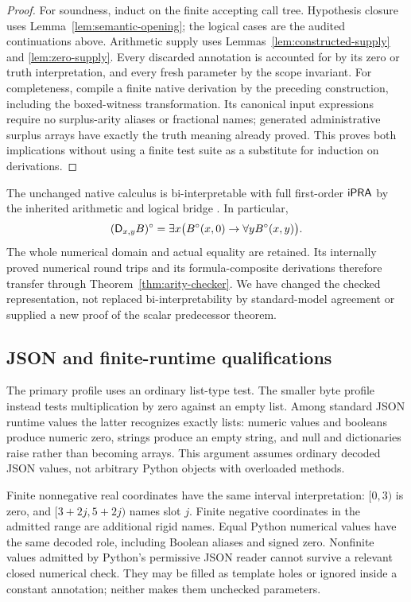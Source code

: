\begin{proof}
For soundness, induct on the finite accepting call tree.  Hypothesis
closure uses Lemma~\ref{lem:semantic-opening}; the logical cases are
the audited continuations above.  Arithmetic supply uses
Lemmas~\ref{lem:constructed-supply} and \ref{lem:zero-supply}.
Every discarded annotation is accounted for by its zero or truth
interpretation, and every fresh parameter by the scope invariant.
For completeness, compile a finite native derivation by the preceding
construction, including the boxed-witness transformation.  Its
canonical input expressions require no surplus-arity aliases or fractional
names; generated administrative surplus arrays have exactly the truth
meaning already proved.  This proves both implications without using a finite test
suite as a substitute for induction on derivations.
\end{proof}

The unchanged native calculus is bi-interpretable with full first-order
$\mathsf{iPRA}$ by the inherited arithmetic and logical bridge
\cite{generated,corpus}.  In particular,
\[
 (\mathsf D_{x,y}B)^\circ
 =\exists x\bigl(B^\circ(x,0)\to\forall yB^\circ(x,y)\bigr).
\]
The whole numerical domain and actual equality are retained.  Its
internally proved numerical round trips and its formula-composite
derivations therefore transfer through
Theorem~\ref{thm:arity-checker}.  We have changed the checked
representation, not replaced bi-interpretability by standard-model
agreement or supplied a new proof of the scalar predecessor theorem.

\subsection{JSON and finite-runtime qualifications}

The primary profile uses an ordinary list-type test.  The smaller byte
profile instead tests multiplication by zero against an empty list.
Among standard JSON runtime values the latter recognizes exactly lists:
numeric values and booleans produce numeric zero, strings produce an
empty string, and null and dictionaries raise rather than becoming
arrays.  This argument assumes ordinary decoded JSON values, not
arbitrary Python objects with overloaded methods.

Finite nonnegative real coordinates have the same interval
interpretation: $[0,3)$ is zero, and $[3+2j,5+2j)$ names slot $j$.
Finite negative coordinates in the admitted range are additional rigid
names.  Equal Python numerical values have the same decoded role,
including Boolean aliases and signed zero.  Nonfinite values admitted
by Python's permissive JSON reader cannot survive a relevant closed
numerical check.  They may be filled as template holes or ignored
inside a constant annotation; neither makes them unchecked parameters.

